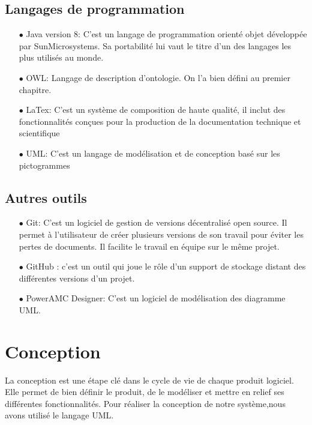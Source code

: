     \subsection{Langages de programmation}
        \begin{itemize}
            \item[\quad $\bullet$] Java version 8: C'est un langage de programmation orienté objet développée par SunMicrosystems. Sa portabilité lui vaut le titre d'un des langages les plus utilisés au monde.
            \item[\quad $\bullet$] OWL: Langage de description d'ontologie. On l'a bien défini au premier chapitre.
            \item[\quad $\bullet$] LaTex: C'est un système de composition de haute qualité, il inclut des fonctionnalités conçues pour la production de la documentation technique et scientifique
            \item[\quad $\bullet$] UML: C'est un langage de modélisation et de conception basé sur les pictogrammes
        \end{itemize}
    \subsection{Autres outils}
        \begin{itemize}
            \item[\quad $\bullet$] Git: C'est un logiciel de gestion de versions décentralisé open source. Il permet à l'utilisateur de créer plusieurs versions de son travail pour éviter les pertes de documents. Il facilite le travail en équipe sur le même projet.
            \item[\quad $\bullet$] GitHub : c'est un outil qui joue le rôle  d'un support de stockage distant des différentes versions d'un projet.
            \item[\quad $\bullet$]PowerAMC Designer: C'est un logiciel de modélisation des diagramme UML.
        \end{itemize}

\section{Conception}
    La conception est une étape clé dans le cycle de vie de chaque produit logiciel. Elle permet de bien définir le produit, de le modéliser et mettre en relief ses différentes fonctionnalités. Pour réaliser la conception de notre système,nous avons utilisé le langage UML.\\
